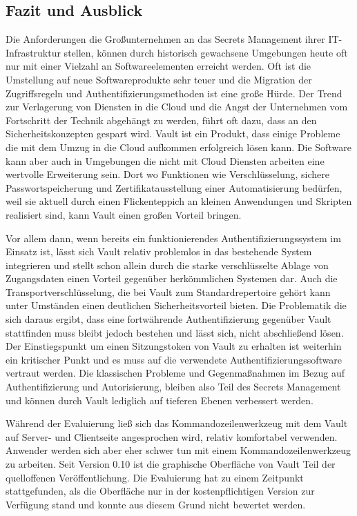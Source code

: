 \documentclass[
book,
a4paper,   
titlepage,  
halfparskip,
12pt        
]{scrartcl}
\begin{document}
\begin{onehalfspacing}
\newpage
\section{Fazit und Ausblick}
\label{sec:ausblick}

Die Anforderungen die Großunternehmen an das Secrets Management ihrer \ac{IT}-Infrastruktur stellen, können durch historisch gewachsene Umgebungen heute oft nur mit einer Vielzahl an Softwareelementen erreicht werden. Oft ist die Umstellung auf neue Softwareprodukte sehr teuer und die Migration der Zugriffsregeln und Authentifizierungsmethoden ist eine große Hürde. Der Trend zur Verlagerung von Diensten in die Cloud und die Angst der Unternehmen vom Fortschritt der Technik abgehängt zu werden, führt oft dazu, dass an den Sicherheitskonzepten gespart wird. Vault ist ein Produkt, dass einige Probleme die mit dem Umzug in die Cloud aufkommen erfolgreich lösen kann. Die Software kann aber auch in Umgebungen die nicht mit Cloud Diensten arbeiten eine wertvolle Erweiterung sein. Dort wo Funktionen wie Verschlüsselung, sichere Passwortspeicherung und Zertifikatausstellung einer Automatisierung bedürfen, weil sie aktuell durch einen Flickenteppich an kleinen Anwendungen und Skripten realisiert sind, kann Vault einen großen Vorteil bringen.

Vor allem dann, wenn bereits ein funktionierendes Authentifizierungssystem im Einsatz ist, lässt sich Vault relativ problemlos in das bestehende System integrieren und stellt schon allein durch die starke verschlüsselte Ablage von Zugangsdaten einen Vorteil gegenüber herkömmlichen Systemen dar. Auch die Transportverschlüsselung, die bei Vault zum Standardrepertoire gehört kann unter Umständen einen deutlichen Sicherheitsvorteil bieten. 
Die Problematik die sich daraus ergibt, dass eine fortwährende Authentifizierung gegenüber Vault stattfinden muss bleibt jedoch bestehen und lässt sich, nicht abschließend lösen. Der Einstiegspunkt um einen Sitzungstoken von Vault zu erhalten ist weiterhin ein kritischer Punkt und es muss auf die verwendete Authentifizierungssoftware vertraut werden. Die klassischen Probleme und Gegenmaßnahmen im Bezug auf Authentifizierung und Autorisierung, bleiben also Teil des Secrets Management und können durch Vault lediglich auf tieferen Ebenen verbessert werden.

Während der Evaluierung ließ sich das Kommandozeilenwerkzeug mit dem Vault auf Server- und Clientseite angesprochen wird, relativ komfortabel verwenden. Anwender werden sich aber eher schwer tun mit einem Kommandozeilenwerkzeug zu arbeiten. Seit Version 0.10 ist die graphische Oberfläche von Vault Teil der quelloffenen Veröffentlichung. Die Evaluierung hat zu einem Zeitpunkt stattgefunden, als die Oberfläche nur in der kostenpflichtigen Version zur Verfügung stand und konnte aus diesem Grund nicht bewertet werden. 


\end{onehalfspacing}
\end{document}
